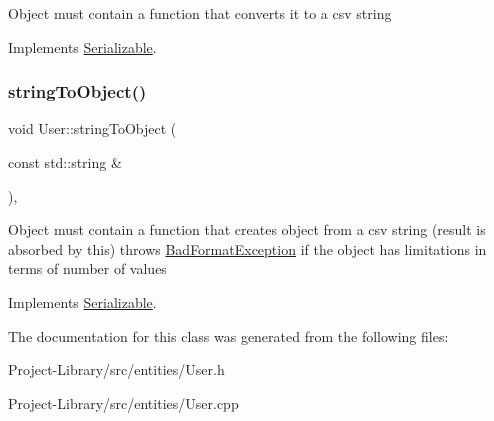 Object must contain a function that converts it to a csv string 

Implements \hyperlink{classSerializable_ab9cd1db8311603ce4250478c3dd3eb81}{Serializable}.

\mbox{\label{classUser_a45730ce65190e6bb9734b5d797484bf9}} 
\subsubsection{\texorpdfstring{string\+To\+Object()}{stringToObject()}}
{\footnotesize\ttfamily void User\+::string\+To\+Object (\begin{DoxyParamCaption}\item[{const std\+::string \&}]{ }\end{DoxyParamCaption})\hspace{0.3cm}{\ttfamily [override]}, {\ttfamily [virtual]}}

Object must contain a function that creates object from a csv string (result is absorbed by this) throws \hyperlink{structBadFormatException}{Bad\+Format\+Exception} if the object has limitations in terms of number of values 

Implements \hyperlink{classSerializable_abaec34cf73821a3234cf4daea584eab3}{Serializable}.



The documentation for this class was generated from the following files\+:\begin{DoxyCompactItemize}
\item 
Project-\/\+Library/src/entities/User.\+h\item 
Project-\/\+Library/src/entities/User.\+cpp\end{DoxyCompactItemize}
